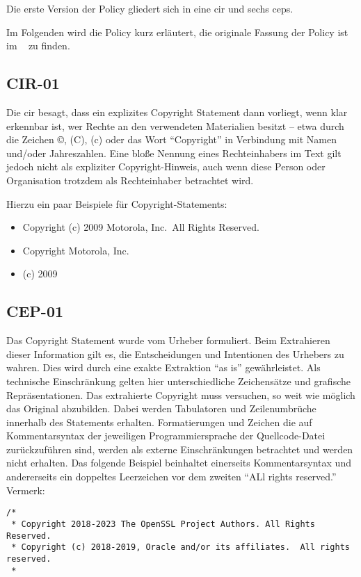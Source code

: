Die erste Version der Policy gliedert sich in eine \gls{cir} und sechs \glspl{cep}.

Im Folgenden wird die Policy kurz erläutert, die originale Fassung der Policy ist im ~ zu finden.


\subsection{CIR-01}\label{subsec:cir-01}

Die \gls{cir} besagt, dass ein explizites Copyright Statement dann vorliegt, wenn klar erkennbar ist, wer Rechte an den verwendeten Materialien besitzt -- etwa durch die Zeichen ©, (C), (c) oder das Wort \enquote{Copyright} in Verbindung mit Namen und/oder Jahreszahlen.
Eine bloße Nennung eines Rechteinhabers im Text gilt jedoch nicht als expliziter Copyright-Hinweis, auch wenn diese Person oder Organisation trotzdem als Rechteinhaber betrachtet wird.

Hierzu ein paar Beispiele für Copyright-Statements:
\begin{itemize}
    \item Copyright (c) 2009 Motorola, Inc.\ All Rights Reserved.
    \item Copyright Motorola, Inc.
    \item (c) 2009
\end{itemize}


\subsection{CEP-01}\label{subsec:cep-01}

Das Copyright Statement wurde vom Urheber formuliert.
Beim Extrahieren dieser Information gilt es, die Entscheidungen und Intentionen des Urhebers zu wahren.
Dies wird durch eine exakte Extraktion \enquote{as is} gewährleistet.
Als technische Einschränkung gelten hier unterschiedliche Zeichensätze und grafische Repräsentationen.
Das extrahierte Copyright muss versuchen, so weit wie möglich das Original abzubilden.
Dabei werden Tabulatoren und Zeilenumbrüche innerhalb des Statements erhalten.
Formatierungen und Zeichen die auf Kommentarsyntax der jeweiligen Programmiersprache der Quellcode-Datei zurückzuführen sind, werden als externe Einschränkungen betrachtet und werden nicht erhalten.
Das folgende Beispiel beinhaltet einerseits Kommentarsyntax und andererseits ein doppeltes Leerzeichen vor dem zweiten \enquote{ALl rights reserved.} Vermerk:
\begin{lstlisting}[numbers=none, keepspaces=true]
/*
 * Copyright 2018-2023 The OpenSSL Project Authors. All Rights Reserved.
 * Copyright (c) 2018-2019, Oracle and/or its affiliates.  All rights reserved.
 *
\end{lstlisting}

